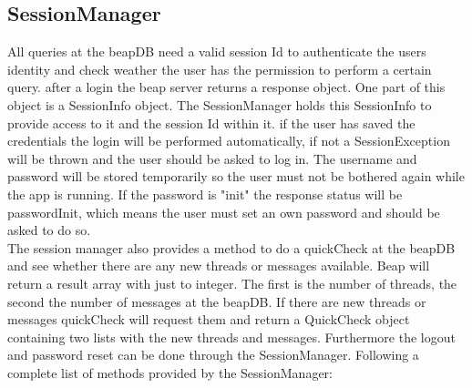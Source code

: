 \documentclass[12pt,a4paper,oneside]{report}
\begin{document}
\subsection{SessionManager}
All queries at the beapDB need a valid session Id to authenticate the users identity and check weather the user has the permission to perform a certain query. after a login the beap server returns a response object. One part of this object is a SessionInfo object. The SessionManager holds this SessionInfo to provide access to it and the session Id within it.
if the user has saved the credentials the login will be performed automatically, if not a SessionException will be thrown and the user should be asked to log in. The username and password will be stored temporarily so the user must not be bothered again while the app is running. 
If the password is "init" the response status will be passwordInit, which means the user must set an own password and should be asked to do so. \\

The session manager also provides a method to do a quickCheck at the beapDB and see whether there are any new threads or messages available. Beap will return a result array with just to integer. The first is the number of threads, the second the number of messages at the beapDB. If there are new threads or messages quickCheck will request them and return a QuickCheck object containing two lists with the new threads and messages.
Furthermore the logout and password reset can be done through the SessionManager.
Following a complete list of methods provided by the SessionManager:
\end{document}
